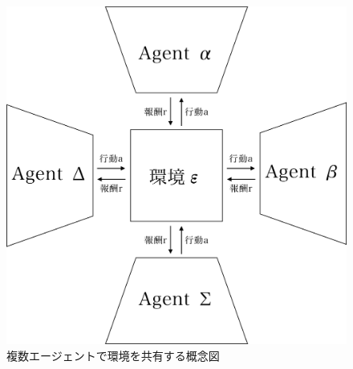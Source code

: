 \begin{figure}[H]
    \centering
    \includegraphics[clip,width = 12.0cm]{assets/multiagent_shared_env.eps}
    \caption{複数エージェントで環境を共有する概念図}  \label{sample}
\end{figure}

